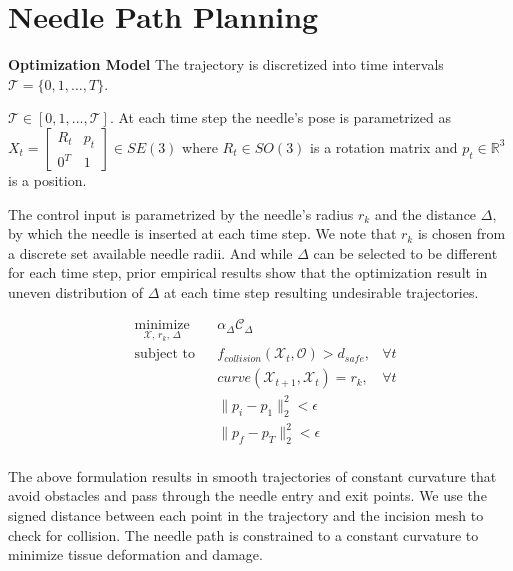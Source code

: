 \documentclass[0-suturing.tex]{subfiles}
\begin{document}
\section{Needle Path Planning}
\noindent \textbf{Optimization Model}
The trajectory is discretized into time intervals $\mathcal{T} = \{0,1,\ldots,T\}$.


$\mathcal{T} \in [0, 1, \ldots, \mathcal{T}]$.
At each time step the needle's pose is parametrized as
$X_t = \begin{bmatrix}
    R_t & p_t \\ 0^T & 1
\end{bmatrix} \in SE(3)$
where $R_t \in SO(3)$ is a rotation matrix and
$ p_t \in  \mathbb{R}^3 $ is a position.

The control input is parametrized by the needle's radius $r_k$ and the distance $\Delta$, by which the needle is inserted at each time step. We note that $r_k$ is chosen from a discrete set available needle radii. And while $\Delta$ can be selected to be different for each time step, prior empirical results show that the optimization result in uneven distribution of $\Delta$ at each time step resulting undesirable trajectories.


\begin{equation*}
\begin{aligned}
& \underset{\mathcal{X},\, r_k,\, \Delta}{\text{minimize}}
& & \alpha_\Delta \mathcal{C}_\Delta \\
& \text{subject to}
& & f_{collision}(\mathcal{X}_t, \mathcal{O}) > d_{safe}, & \forall t  \\
& & & curve(\mathcal{X}_{t+1}, \mathcal{X}_t) = r_k, & \forall t  \\
& & & \|p_i-p_1\|_2^2 < \epsilon \\
& & & \|p_f-p_T\|_2^2 < \epsilon \\
\end{aligned}
\end{equation*}

The above formulation results in smooth trajectories of constant curvature that
avoid obstacles and pass through the needle entry and exit points. We use the
signed distance between each point in the trajectory and the incision mesh to
check for collision. The needle path is constrained to a constant curvature to
minimize tissue deformation and damage.
\end{document}
